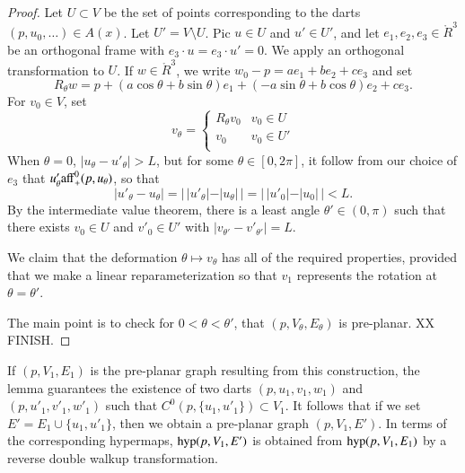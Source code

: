 \begin{proof}
Let $U\subset V$ be the set of points corresponding
to the darts $(p,u_0,\ldots)\in A(x)$.  Let $U'=V\setminus U$.
Pic $u\in U$ and $u'\in U'$, and let $e_1,e_2,e_3\in\ring{R}^3$ be 
an orthogonal frame with $e_3\cdot u = e_3\cdot u' = 0$.
We apply an orthogonal transformation to $U$.
If $w\in\ring{R}^3$, we write
$w_0-p = a e_1 + b e_2 + c e_3$ and set
$$R_\theta w = p + (a\cos\theta+b\sin\theta) e_1 +
   (-a\sin\theta+b\cos\theta) e_2 + c e_3.$$
For $v_0\in V$, set
  $$
  v_\theta = \begin{cases}
    R_\theta v_0 & v_0\in U\\
    v_0 & v_0\in U'\\
    \end{cases}
  $$
When $\theta=0$, $|u_\theta-u'_\theta|>L$, but for some $\theta\in[0,2\pi]$,
it follow from our choice of $e_3$ that
$u'_\theta{\operatorname{aff}}_+^0(p,u_\theta)$, so that
$$|u'_\theta - u_\theta| = |\,|u'_\theta| - |u_\theta|\,|
  = |\,|u'_0| - |u_0|\,| < L.$$
By the intermediate value theorem, there is a least angle
$\theta'\in(0,\pi)$ such that there exists $v_0\in U$
and $v'_0\in U'$ with $|v_{\theta'}-v'_{\theta'}|=L$.

We claim that the deformation $\theta\mapsto v_\theta$
has all of the required properties, provided that we make
a linear reparameterization so that $v_1$ represents the
rotation at $\theta=\theta'$.

The main point is to check for $0 < \theta < \theta'$,
that $(p,V_\theta,E_\theta)$ is pre-planar.
XX FINISH.
\end{proof}

If $(p,V_1,E_1)$ is the pre-planar graph resulting from
this construction, the lemma guarantees the existence
of two darts $(p,u_1,v_1,w_1)$ and $(p,u'_1,v'_1,w'_1)$
such that $C^0(p,\{u_1,u'_1\})\subset V_1$.  It follows
that if we set $E' = E_1 \cup \{u_1,u'_1\}$, then we obtain
a pre-planar graph $(p,V_1,E')$.  In terms of the 
corresponding hypermaps, ${\operatorname{hyp}}(p,V_1,E')$ is obtained from
${\operatorname{hyp}}(p,V_1,E_1)$ by a reverse double walkup transformation.




